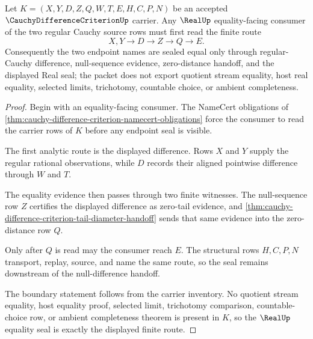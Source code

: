 \begin{theorem}
\label{thm:cauchy-difference-criterion-real-seal-boundary}
Let $K=(X,Y,D,Z,Q,W,T,E,H,C,P,N)$ be an accepted $\CauchyDifferenceCriterionUp$ carrier. Any $\RealUp$ equality-facing consumer of the two regular Cauchy source rows must first read the finite route
$$
X,Y \longrightarrow D \longrightarrow Z \longrightarrow Q \longrightarrow E .
$$
Consequently the two endpoint names are sealed equal only through regular-Cauchy difference, null-sequence evidence, zero-distance handoff, and the displayed Real seal; the packet does not export quotient stream equality, host real equality, selected limits, trichotomy, countable choice, or ambient completeness.
\end{theorem}
\begin{proof}
Begin with an equality-facing consumer. The NameCert obligations of \autoref{thm:cauchy-difference-criterion-namecert-obligations} force the consumer to read the carrier rows of $K$ before any endpoint seal is visible.

The first analytic route is the displayed difference. Rows $X$ and $Y$ supply the regular rational observations, while $D$ records their aligned pointwise difference through $W$ and $T$.

The equality evidence then passes through two finite witnesses. The null-sequence row $Z$ certifies the displayed difference as zero-tail evidence, and \autoref{thm:cauchy-difference-criterion-tail-diameter-handoff} sends that same evidence into the zero-distance row $Q$.

Only after $Q$ is read may the consumer reach $E$. The structural rows $H,C,P,N$ transport, replay, source, and name the same route, so the seal remains downstream of the null-difference handoff.

The boundary statement follows from the carrier inventory. No quotient stream equality, host equality proof, selected limit, trichotomy comparison, countable-choice row, or ambient completeness theorem is present in $K$, so the $\RealUp$ equality seal is exactly the displayed finite route.
\end{proof}

